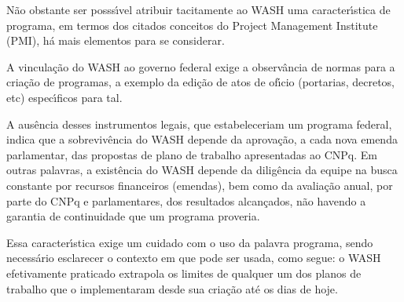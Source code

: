 \documentclass[
12pt,		%
openright,	%
twoside,  %
a4paper,			%
chapter=TITLE,		%
english,			%
french,				%
spanish,			%
brazil				%
]{USPSC-classe/USPSC}
\begin{document}
N\~ao obstante ser posss\'{\i}vel atribuir tacitamente ao WASH uma caracter\'{\i}stica de programa, em termos dos citados conceitos do Project Management Institute (PMI), h\'a mais elementos para se considerar.

















A vincula\c{c}\~ao do WASH ao governo federal exige a observ\^ancia de normas para a cria\c{c}\~ao de programas, a exemplo da edi\c{c}\~ao de atos de of\'{\i}cio (portarias, decretos, etc) espec\'{\i}ficos para tal.

















A aus\^encia desses instrumentos legais, que estabeleceriam um \textquotedbl programa federal\textquotedbl , indica que a sobreviv\^encia do WASH depende da aprova\c{c}\~ao, a cada nova emenda parlamentar, das propostas de plano de trabalho apresentadas ao CNPq. Em outras palavras, a exist\^encia do WASH depende da dilig\^encia da equipe na busca constante por recursos financeiros (emendas), bem como da avalia\c{c}\~ao anual, por parte do CNPq e parlamentares, dos resultados alcan\c{c}ados, n\~ao havendo a garantia de continuidade que um programa proveria.

















Essa caracter\'{\i}stica exige um cuidado com o uso da palavra \textquotedbl programa\textquotedbl , sendo necess\'ario esclarecer o contexto em que pode ser usada, como segue: o WASH efetivamente praticado extrapola os limites de qualquer um dos planos de trabalho que o implementaram desde sua cria\c{c}\~ao at\'e os dias de hoje.
\end{document}

